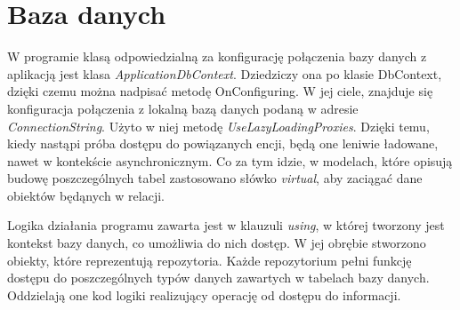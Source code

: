 \section{Baza danych}
W programie klasą odpowiedzialną za konfigurację połączenia bazy danych z aplikacją jest klasa \textit{ApplicationDbContext}. Dziedziczy ona po klasie DbContext, dzięki czemu można nadpisać metodę OnConfiguring. W jej ciele, znajduje się konfiguracja połączenia z lokalną bazą danych podaną w adresie \textit{ConnectionString}. Użyto w niej metodę \textit{UseLazyLoadingProxies}. Dzięki temu, kiedy nastąpi próba dostępu do powiązanych encji, będą one leniwie ładowane, nawet w kontekście asynchronicznym. Co za tym idzie, w modelach, które opisują budowę poszczególnych tabel zastosowano słówko \textit{virtual}, aby zaciągać dane obiektów będąnych w relacji.\newline

Logika działania programu zawarta jest w klauzuli \textit{using}, w której tworzony jest kontekst bazy danych, co umożliwia do nich dostęp. W jej obrębie stworzono obiekty, które reprezentują repozytoria. Każde repozytorium pełni funkcję dostępu do poszczególnych typów danych zawartych w tabelach bazy danych. Oddzielają one kod logiki realizujący operację od dostępu do informacji.